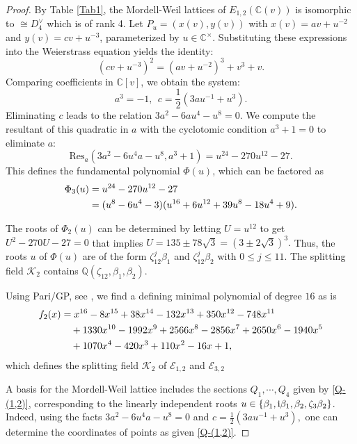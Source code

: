 \documentclass[11pt]{amsart}
\newcommand{\Ee}{{\mathcal E}}
\numberwithin{equation}{section}
\numberwithin{table}{section}
\newcommand\<{\langle}
\begin{document}
\begin{proof}
By Table \ref{Tab1}, the   Mordell-Weil lattices of  $E_{1,2}(\mathbb{C}(v)) $ is isomorphic to $\cong D_4^\vee$ which is of rank 4.
Let  $P_u = (x(v), y(v))$ with $x(v) = a v + u^{-2}$ and $y(v) = c v + u^{-3}$, parameterized by $u \in \mathbb{C}^\times$. Substituting these expressions into the Weierstrass equation yields the identity:
	\[ (c v + u^{-3})^2 = (a v + u^{-2})^3 + v^3 + v. \]
	Comparing coefficients in $\mathbb{C}[v]$, we obtain the system:
	\begin{equation*}
		a^3  = -1,   \ \ 
		c = \frac{1}{2}(3au^{-1} + u^3).
	\end{equation*}
	Eliminating $c$ leads to the relation $3a^2 - 6au^4 - u^8 = 0$. We compute the resultant of this quadratic in $a$ with the cyclotomic condition $a^3+1=0$ to eliminate $a$:
	\[ \mathrm{Res}_a(3a^2 - 6u^4 a - u^8, a^3+1) = u^{24} - 270u^{12} - 27. \]
	This defines the fundamental polynomial $\Phi(u)$, which can be factored as
	\begin{align}
		\Phi_3(u)  & =u^{24} - 270u^{12} - 27\notag \\
		& = (u^8 - 6u^4 - 3)(u^{16} + 6u^{12} + 39u^8 - 18u^4 + 9).
	\end{align} 
	
	

	The roots of $\Phi_2(u)$ can be determined by letting $U = u^{12}$ to get
	$ U^2 - 270 U - 27 = 0$ that  implies $U = 135 \pm 78\sqrt{3} = (3 \pm 2\sqrt{3})^3. $  Thus, 
	the roots $u$  of $\Phi(u)$ are of the form $\zeta_{12}^j \beta_1 $ and $ \zeta_{12}^j \beta_2  $ with  $0 \leq j \leq 11$.  The splitting field  $\mathcal{K}_2$ contains $ \mathbb{Q}(\zeta_{12}, \beta_1, \beta_2)$.
	
		Using Pari/GP, see \cite[Gp360]{Shioda360-Codes}, we find a defining minimal polynomial of degree $16$ as 
is
	\begin{align}
		f_2(x)	& = x^{16} - 8x^{15} + 38x^{14} - 132x^{13} + 350x^{12} - 748x^{11} \notag \\
		&\quad + 1330x^{10} - 1992x^9 + 2566x^8 - 2856x^7 + 2650x^6 - 1940x^5 \notag \\
		&\quad + 1070x^4 - 420x^3 + 110x^2 - 16x + 1,
		\label{f-(1,2)}
	\end{align} 
	which defines   the splitting field  $\mathcal{K}_2$ of   $\Ee_{1,2}$ and $\Ee_{3,2}$
	
 	
	
	A basis for the Mordell-Weil lattice includes the sections $Q_1, \cdots, Q_4$
	  given by   \ref{Q-(1,2)},   corresponding to the linearly independent roots $u \in \{ \beta_1, {\rm{i}} \beta_1, \beta_2, \zeta_3 \beta_2 \}$. Indeed, using the facts 
	   $3a^2 - 6u^4 a - u^8=0$  and  $c = \frac{1}{2}(3au^{-1} + u^3),$ one can determine the coordinates of   points as given  \ref{Q-(1,2)}.
	  

\end{proof}
\end{document}
